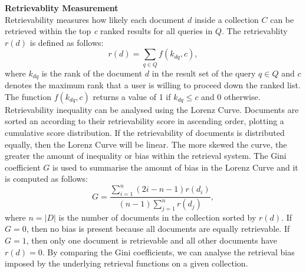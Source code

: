 \textbf{Retrievablity Measurement}
\ \\
Retrievability measures how likely each document $ d $ inside a collection $ C $ can be retrieved within the top \textit{c} ranked results for all queries in $ Q $. The retrievablity $ r(d) $ is defined as follows:
\[
r(d)=\sum_{q \in Q}f(k_{dq},c),
\]
where $ k_{dq} $ is the rank of the document $ d $ in the result set of the query $ q \in Q $ and $ c $ denotes the maximum rank that a user is willing to proceed down the ranked list. The function $ f(k_{dq},c) $ returns a value of 1 if $ k_{dq} \leq c $ and 0 otherwise. Retrievability inequality can be analysed using the Lorenz Curve. Documents are sorted an according to their retrievability score in ascending order, plotting a cumulative score distribution. If the retrievability of documents is distributed equally, then the Lorenz Curve will be linear. The more skewed the curve, the greater the amount of inequality or bias within the retrieval system. The Gini coefficient $ G $ is used to summarise the amount of bias in the Lorenz Curve and it is computed as follows:
\begin{equation}
G=\frac{\sum_{i=1}^n(2i-n-1)r(d_{i})}{(n-1)\sum_{j=1}^nr(d_{j})},
\end{equation}
\noindent
where $ n=|D| $ is the number of documents in the collection sorted by $ r(d) $. If $ G=0 $, then no bias is present because all documents are equally retrievable. If $ G=1 $, then only one document is retrievable and all other documents have $ r(d)=0 $. By comparing the Gini coefficients, we can analyse the retrieval bias imposed by the underlying retrieval functions on a given collection.

